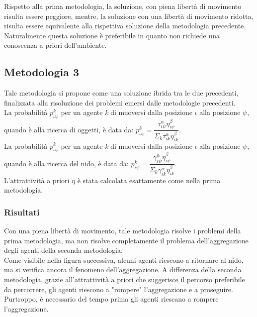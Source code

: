 \documentclass[12pt,a4paper,openright,twoside]{report}
\begin{document}
Rispetto alla prima metodologia, la soluzione, con piena libertà di movimento risulta essere peggiore, mentre, la soluzione con una libertà di movimento ridotta, risulta essere equivalente alla rispettiva soluzione della metodologia precedente. Naturalmente questa soluzione è preferibile in quanto non richiede una conoscenza a priori dell'ambiente.

\subsection{Metodologia 3}

Tale metodologia si propone come una soluzione ibrida tra le due precedenti, finalizzata alla risoluzione dei problemi emersi dalle metodologie precedenti.\\
La probabilità $p^k_{\iota\psi}$ per un agente \textit{k} di muoversi dalla posizione $\iota$ alla posizione $\psi$, quando è alla ricerca di oggetti, è data da: $p^k_{\iota\psi}= \dfrac{\tau^\alpha_{\iota\psi}\eta^\beta_{\iota\psi}}{\Sigma_k\tau^\alpha_{\iota k}\eta^\beta_{\iota k}}$. \\
La probabilità $p^k_{\iota\psi}$ per un agente \textit{k} di muoversi dalla posizione $\iota$ alla posizione $\psi$, quando è alla ricerca del nido, è data da: $p^k_{\iota\psi}= \dfrac{\gamma^\alpha_{\iota\psi}\eta^\beta_{\iota\psi}}{\Sigma_k\gamma^\alpha_{\iota k}\eta^\beta_{\iota k}}$. \\
L'attrattività a priori $\eta$ è stata calcolata esattamente come nella prima metodologia.\\

\subsubsection{Risultati}

Con una piena libertà di movimento, tale metodologia risolve i problemi della prima metodologia, ma non risolve completamente il problema dell'aggregazione degli agenti della seconda metodologia.\\
Come visibile nella figura successiva, alcuni agenti riescono a ritornare al nido, ma si verifica ancora il fenomeno dell'aggregazione. A differenza della seconda metodologia, grazie all'attrattività a priori che suggerisce il percorso preferibile da percorrere, gli agenti riescono a "rompere" l'aggregazione e a proseguire. Purtroppo, è necessario del tempo prima gli agenti riescano a rompere l'aggregazione.\\
\end{document}
